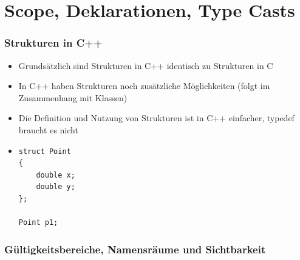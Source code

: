 
\part{Scope, Deklarationen, Type Casts}
\label{sec:Kapitel 5: Scope, Deklarationen, Type Casts}


\section{Strukturen in C++}
\label{sec:Strukturen in C++}
\begin{itemize}
	\item Grundsätzlich sind Strukturen in C++ identisch zu Strukturen in C
	\item In C++ haben Strukturen noch zusätzliche Möglichkeiten (folgt im Zusammenhang mit Klassen)
	\item Die Definition und Nutzung von Strukturen ist in C++ einfacher, typedef braucht es nicht
	\item[\-] 
	\noindent
\begin{minipage}{\linewidth}
\begin{lstlisting}
struct Point
{
	double x;
	double y;		
};
	
Point p1;
\end{lstlisting}
\end{minipage}
\end{itemize}

\section{Gültigkeitsbereiche, Namensräume und Sichtbarkeit}
\label{sec:Gueltigkeitsbereiche, Namensraeume und Sichtbarkeit}


